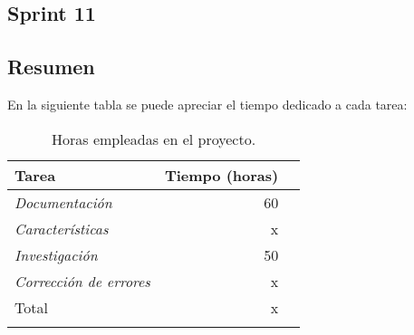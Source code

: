 \subsection{Sprint 11}


\subsection{Resumen}
En la siguiente tabla se puede apreciar el tiempo dedicado a cada tarea:


\begin{longtable}[]{@{}lrr@{}}
\toprule
\begin{minipage}[b]{0.37\columnwidth}\raggedright\strut
Tarea\strut
\end{minipage} & \begin{minipage}[b]{0.37\columnwidth}\raggedleft\strut
Tiempo (horas)\strut
\end{minipage}\tabularnewline
\midrule
\endhead
\begin{minipage}[t]{0.37\columnwidth}\raggedright\strut
\emph{Documentación}\strut
\end{minipage} & \begin{minipage}[t]{0.37\columnwidth}\raggedleft\strut
60\strut
\end{minipage}\tabularnewline
\begin{minipage}[t]{0.37\columnwidth}\raggedright\strut
\emph{Características}\strut
\end{minipage} & \begin{minipage}[t]{0.37\columnwidth}\raggedleft\strut
x\strut
\end{minipage}\tabularnewline
\begin{minipage}[t]{0.37\columnwidth}\raggedright\strut
\emph{Investigación}\strut
\end{minipage}& \begin{minipage}[t]{0.37\columnwidth}\raggedleft\strut
50\strut
\end{minipage}\tabularnewline
\begin{minipage}[t]{0.37\columnwidth}\raggedright\strut
\emph{Corrección de errores}\strut
\end{minipage} & \begin{minipage}[t]{0.37\columnwidth}\raggedleft\strut
x\strut
\end{minipage}\tabularnewline
\midrule
\begin{minipage}[t]{0.37\columnwidth}\raggedright\strut
Total\strut
\end{minipage} & \begin{minipage}[t]{0.37\columnwidth}\raggedleft\strut
x\strut
\end{minipage}\tabularnewline
\bottomrule
\caption{Horas empleadas en el proyecto.}
\end{longtable}




